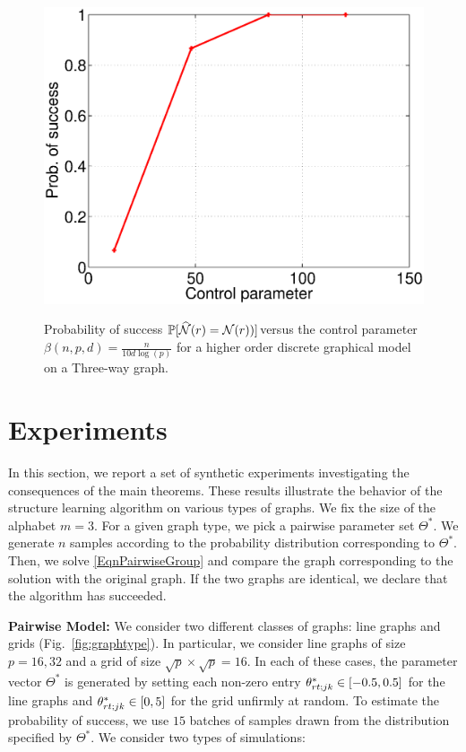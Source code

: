 \begin{figure}[t]
\centering
\includegraphics[scale=0.3]{figures/spade16nNode3.eps}
\label{fig:higherOrder}
\caption{Probability of success \small$\mathbb{P}[\widehat{\mathcal{N}}(r) = \mathcal{N}(r))]$\normalsize versus the control parameter $\beta(n, p, d) = \frac{n}{10 d \log(p)}$ for a higher order discrete graphical model on a Three-way graph.}
\end{figure}

\section{Experiments}
\noindent In this section, we report a set of synthetic experiments investigating the consequences of the main theorems. These results illustrate the behavior of the structure learning algorithm on various types of graphs. We fix the size of the alphabet $m=3$. For a given graph type, we pick a pairwise parameter set $\Theta^*$. We generate $n$ samples according to the probability distribution corresponding to $\Theta^*$. Then, we solve \eqref{EqnPairwiseGroup} and compare the graph corresponding to the solution with the original graph. If the two graphs are identical, we declare that the algorithm has succeeded.


{\bf Pairwise Model:} We consider two different classes of graphs: line graphs and grids (Fig.~\ref{fig:graphtype}). In particular, we consider line graphs of size $p=16,32$ and a grid of size $\sqrt{p}\times \sqrt{p} = 16$. In each of these cases, the parameter vector $\Theta^*$ is generated by setting each non-zero entry $\theta^*_{r t;jk} \in [-0.5, 0.5]$ for the line graphs and $\theta^*_{r t;jk} \in [0, 5]$ for the grid unfirmly at random. To estimate the probability of success, we use $15$ batches of samples drawn from the distribution specified by $\Theta^*$. We consider two types of simulations:

